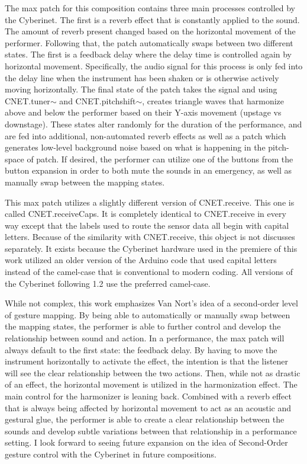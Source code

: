 The max patch for this composition contains three main processes controlled by the Cyberinet. The first is a reverb effect that is constantly applied to the sound. The amount of reverb present changed based on the horizontal movement of the performer. Following that, the patch automatically swaps between two different states. The first is a feedback delay where the delay time is controlled again by horizontal movement. Specifically, the audio signal for this process is only fed into the delay line when the instrument has been shaken or is otherwise actively moving horizontally. The final state of the patch takes the signal and using CNET.tuner$\sim$ and CNET.pitchshift$\sim$, creates triangle waves that harmonize above and below the performer based on their Y-axis movement (upstage vs downstage). These states alter randomly for the duration of the performance, and are fed into additional, non-automated reverb effects as well as a patch which generates low-level background noise based on what is happening in the pitch-space of patch. If desired, the performer can utilize one of the buttons from the button expansion in order to both mute the sounds in an emergency, as well as manually swap between the mapping states.

This max patch utilizes a slightly different version of CNET.receive. This one is called CNET.receiveCaps. It is completely identical to CNET.receive in every way except that the labels used to route the sensor data all begin with capital letters. Because of the similarity with CNET.receive, this object is not discusses separately. It exists because the Cyberinet hardware used in the premiere of this work utilized an older version of the Arduino code that used capital letters instead of the camel-case that is conventional to modern coding. All versions of the Cyberinet following 1.2 use the preferred camel-case.

While not complex, this work emphasizes Van Nort's idea of a second-order level of gesture mapping\cite{vanNortMapping2007}. By being able to automatically or manually swap between the mapping states, the performer is able to further control and develop the relationship between sound and action. In a performance, the max patch will always default to the first state: the feedback delay. By having to move the instrument horizontally to activate the effect, the intention is that the listener will see the clear relationship between the two actions. Then, while not as drastic of an effect, the horizontal movement is utilized in the harmonization effect. The main control for the harmonizer is leaning back. Combined with a reverb effect that is always being affected by horizontal movement to act as an acoustic and gestural glue, the performer is able to create a clear relationship between the sounds and develop subtle variations between that relationship in a performance setting. I look forward to seeing future expansion on the idea of Second-Order gesture control with the Cyberinet in future compositions.

